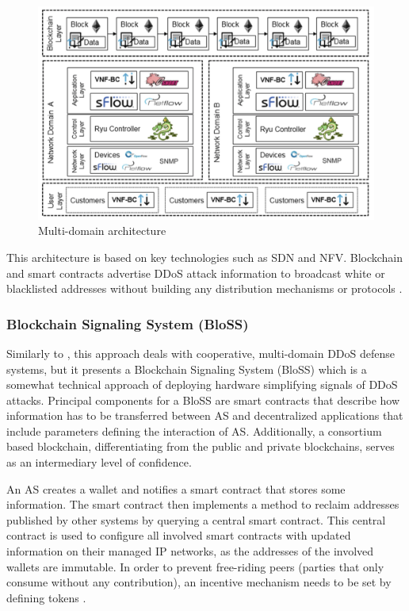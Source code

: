 \begin{figure}[ht]
  \begin{center}
    \includegraphics[scale=0.5]{Talk7/img/ddos/multi_domain}
  \end{center}
  \caption{Multi-domain architecture}
  \label{ddos_multi_domain_architecture}
\end{figure}

This architecture is based on key technologies such as SDN and NFV. Blockchain and smart contracts advertise DDoS attack information to broadcast white or blacklisted addresses without building any distribution mechanisms or protocols \cite{Rodrigues2017}.

\subsubsection{Blockchain Signaling System (BloSS)}

Similarly to \cite{Rodrigues2017}, this approach deals with cooperative, multi-domain DDoS defense systems, but it presents a Blockchain Signaling System (BloSS) which is a somewhat technical approach of deploying hardware simplifying signals of DDoS attacks. Principal components for a BloSS are smart contracts that describe how information has to be transferred between AS and decentralized applications that include parameters defining the interaction of AS. Additionally, a consortium based blockchain, differentiating from the public and private blockchains, serves as an intermediary level of confidence.

An AS creates a wallet and notifies a smart contract that stores some information. The smart contract then implements a method to reclaim addresses published by other systems by querying a central smart contract. This central contract is used to configure all involved smart contracts with updated information on their managed IP networks, as the addresses of the involved wallets are immutable. In order to prevent free-riding peers (parties that only consume without any contribution), an incentive mechanism needs to be set by defining tokens \cite{Rodrigues2019}.  %

